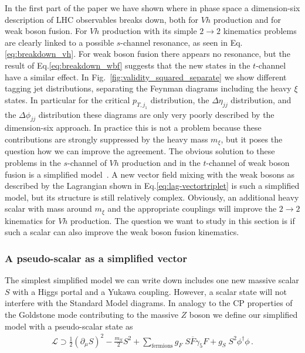In the first part of the paper we have shown where in phase space a
dimension-six description of LHC observables breaks down, both for $Vh$
production and for weak boson fusion. For $Vh$ production with its
simple $2 \to 2$ kinematics problems are clearly linked to a possible
$s$-channel resonance, as seen in Eq.\;\eqref{eq:breakdown_vh}.  For
weak boson fusion there appears no resonance, but the result of
Eq.\;\eqref{eq:breakdown_wbf} suggests that the new states in the
$t$-channel have a similar effect.  In Fig.~\ref{fig:validity_squared_separate}
we show different tagging jet distributions, separating the Feynman
diagrams including the heavy $\xi$ states. In particular for the
critical $p_{T,j_1}$ distribution, the $\Delta \eta_{jj}$
distribution, and the $\Delta \phi_{jj}$ distribution these diagrams
are only very poorly described by the dimension-six approach. In
practice this is not a problem because these contributions are
strongly suppressed by the heavy mass $m_\xi$, but it poses the
question how we can improve the agreement. The obvious solution to
these problems in the $s$-channel of $Vh$ production and in the
$t$-channel of weak boson fusion is a simplified
model~\cite{simp,simp_higgs}. A new vector field mixing with the weak
bosons as described by the Lagrangian shown in
Eq.\;\eqref{eq:lag-vectortriplet} is such a simplified model, but its
structure is still relatively complex. Obviously, an additional heavy
scalar with mass around $m_\xi$ and the appropriate couplings will
improve the $2 \to 2$ kinematics for $Vh$ production. The question we
want to study in this section is if such a scalar can also improve the
weak boson fusion kinematics.



\subsubsection*{A pseudo-scalar as a simplified vector}

The simplest simplified model we can write down includes one new
massive scalar $S$ with a Higgs portal and a Yukawa coupling. 
However, a scalar state will not interfere with the Standard Model
diagrams. In analogy to the CP properties of the Goldstone mode
contributing to the massive $Z$ boson we define our simplified model
with a pseudo-scalar state as
%
\begin{align}
\mathcal{L} \supset 
  \frac{1}{2} (\partial_\mu S)^2 
- \frac{m_S}{2} S^2 
+ \sum_\text{fermions} g_F \; S \overline{F} \gamma_5 F 
+ g_S \; S^2 \phi^\dagger \phi \,.
  \label{eq:simplified_model}
\end{align}

